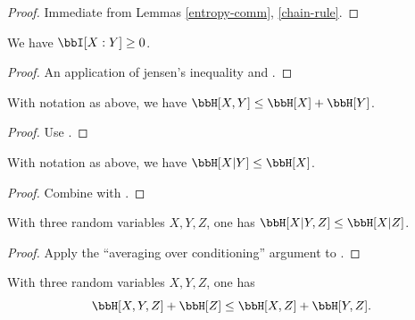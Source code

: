 \begin{proof}
  \leanok
  Immediate from Lemmas \ref{entropy-comm}, \ref{chain-rule}.
\end{proof}

\begin{lemma}
  \label{mutual-nonneg}
  \leanok
  We have $\bbI[X:Y] \geq 0$.
\end{lemma}

\begin{proof}
  \leanok

  An application of jensen's inequality and .
\end{proof}

\begin{corollary}[Subadditivity]
  \label{subadditive}
  \leanok
  With notation as above, we have $\bbH[X,Y] \leq \bbH[X] + \bbH[Y]$.
\end{corollary}

\begin{proof}
  \leanok
  Use .
\end{proof}

\begin{corollary}
  \label{cond-reduce}
  \leanok
  With notation as above, we have $\bbH[X|Y] \leq \bbH[X]$.
\end{corollary}
\begin{proof}
  \leanok
  Combine  with .
\end{proof}

\begin{corollary}[Submodularity]\label{submodularity}
  \leanok
  With three random variables $X,Y,Z$, one has $\bbH[X|Y,Z] \leq \bbH[X|Z]$.
\end{corollary}

\begin{proof} \leanok Apply the ``averaging over conditioning'' argument to .
\end{proof}

\begin{corollary}\label{alt-submodularity}
  \leanok
  With three random variables $X,Y,Z$, one has
  $$ \bbH[X,Y,Z] + \bbH[Z] \leq \bbH[X,Z] + \bbH[Y,Z].$$
\end{corollary}

